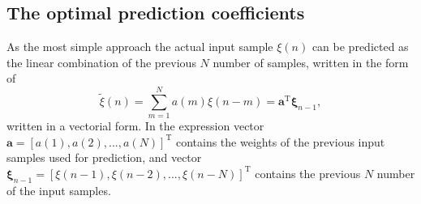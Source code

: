 \subsection{The optimal prediction coefficients}
As the most simple approach the actual input sample $\xi(n)$ can be predicted as the linear combination of the previous $N$ number of samples, written in the form of
\begin{equation}
\tilde{\xi}(n) = \sum_{m=1}^N a(m) \xi(n-m) = \mathbf{a}^{\mathrm{T}} \mathbf{\xi}_{n-1},
\label{Eq:lin_pred}
\end{equation}
written in a vectorial form.
In the expression vector $\mathbf{a} = [a(1), a(2),...,a(N)]^{\mathrm{T}}$ contains the weights of the previous input samples used for prediction, and vector $\mathbf{\xi}_{n-1} = [\xi(n-1),\xi(n-2),...,\xi(n-N)]^{\mathrm{T}}$ contains the previous $N$ number of the input samples.

